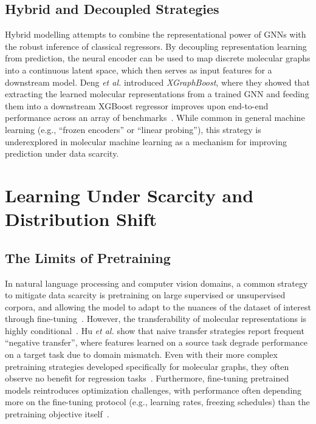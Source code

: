 \subsection{Hybrid and Decoupled Strategies}
Hybrid modelling attempts to combine the representational power of GNNs with the robust inference of classical regressors. By decoupling representation learning from prediction, the neural encoder can be used to map discrete molecular graphs into a continuous latent space, which then serves as input features for a downstream model. Deng \textit{et al.} introduced \textit{XGraphBoost}, where they showed that extracting the learned molecular representations from a trained GNN and feeding them into a downstream XGBoost regressor improves upon end-to-end performance across an array of benchmarks~\cite{deng2021xgraphboost}.
While common in general machine learning (e.g., ``frozen encoders'' or ``linear probing''), this strategy is underexplored in molecular machine learning as a mechanism for improving prediction under data scarcity.

\section{Learning Under Scarcity and Distribution Shift}

\subsection{The Limits of Pretraining}
In natural language processing and computer vision domains, a common strategy to mitigate data scarcity is pretraining on large supervised or unsupervised corpora, and allowing the model to adapt to the nuances of the dataset of interest through fine-tuning~\cite{devlin2019bert}. However, the transferability of molecular representations is highly conditional~\cite{you2020graph, qiu2020gcc}. Hu \textit{et al.} show that naive transfer strategies report frequent ``negative transfer'', where features learned on a source task degrade performance on a target task due to domain mismatch. Even with their more complex pretraining strategies developed specifically for molecular graphs, they often observe no benefit for regression tasks~\cite{hu2019strategies}. Furthermore, fine-tuning pretrained models reintroduces optimization challenges, with performance often depending more on the fine-tuning protocol (e.g., learning rates, freezing schedules) than the pretraining objective itself~\cite{mosbach2020stability}.

